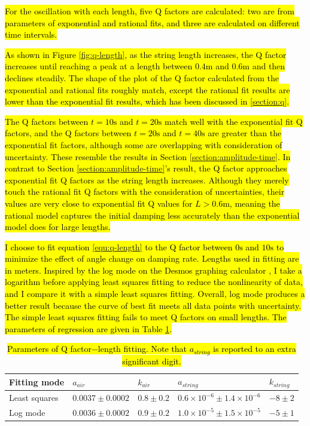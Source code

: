 \documentclass[12pt]{article}
\DeclareRobustCommand{\hlnew}[1]{{\sethlcolor{hlcnew}\hl{#1}}}
\begin{document}
\hlnew{For the oscillation with each length, five Q factors are calculated: two are from parameters of exponential and rational fits, and three are calculated on different time intervals.}

\hlnew{As shown in Figure {\ref{fig:q-length}}, as the string length increases, the Q factor increases until reaching a peak at a length between $0.4\mathrm{m}$ and $0.6\mathrm{m}$ and then declines steadily. The shape of the plot of the Q factor calculated from the exponential and rational fits roughly match, except the rational fit results are lower than the exponential fit results, which has been discussed in {\ref{section:q}}.}

\hlnew{The Q factors between $t=10\mathrm{s}$ and $t=20\mathrm{s}$ match well with the exponential fit Q factors, and the Q factors between $t=20\mathrm{s}$ and $t=40\mathrm{s}$ are greater than the exponential fit factors, although some are overlapping with consideration of uncertainty. These resemble the results in Section {\ref{section:amplitude-time}}. In contrast to Section {\ref{section:amplitude-time}}'s result, the Q factor approaches exponential fit Q factors as the string length increases. Although they merely touch the rational fit Q factors with the consideration of uncertainties, their values are very close to exponential fit Q values for $L>0.6\mathrm{m}$, meaning the rational model captures the initial damping less accurately than the exponential model does for large lengths.}

\hlnew{I choose to fit equation {\ref{equ:q-length}} to the Q factor between $0\mathrm{s}$ and $10\mathrm{s}$ to minimize the effect of angle change on damping rate. Lengths used in fitting are in meters. Inspired by the log mode on the Desmos graphing calculator {\cite{desmos-log-mode}}, I take a logarithm before applying least squares fitting to reduce the nonlinearity of data, and I compare it with a simple least squares fitting. Overall, log mode produces a better result because the curve of best fit meets all data points with uncertainty. The simple least squares fitting fails to meet Q factors on small lengths. The parameters of regression are given in Table {\ref{table:q-length-fit}}.}

\begin{table}[h]
\begin{tabularx}{\textwidth}{ |X|l|l|l|l| }
\hline
Fitting mode &
$a_{air}$ & $k_{air}$ &
$a_{string}$ & $k_{string}$
\\ \hline
Least squares &
$0.0037\pm0.0002$ & $0.8\pm0.2$ &
$0.6\times10^{-6}\pm1.4\times10^{-6}$ & $-8\pm2$
\\ \hline
Log mode &
$0.0036\pm0.0002$ & $0.9\pm0.2$ &
$1.0\times10^{-5}\pm1.5\times10^{-5}$ & $-5\pm1$
\\ \hline
\end{tabularx}
\caption{\hlnew{Parameters of Q factor$-$length fitting. Note that $a_{string}$ is reported to an extra significant digit.}}
\label{table:q-length-fit}
\end{table}
\end{document}
